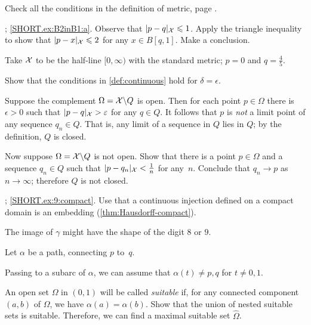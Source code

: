 \setcounter{eqtn}{0}

\begin{multicols}{2}

 Check all the conditions in the definition of metric, page \pageref{page:def:metric}.

\parbf{\ref{ex:B2inB1}}; \ref{SHORT.ex:B2inB1:a}.
Observe that $\dist{p}{q}{\spc{X}}\le 1$. 
Apply the triangle inequality to show that $\dist{p}{x}{\spc{X}}\le 2$ for any $x\in B[q,1]$.
Make a conclusion.

Take $\mathcal{X}$ to be the half-line $[0,\infty)$ with the standard metric; $p=0$ and $q=\tfrac45$.

Show that the conditions in \ref{def:continuous} hold for $\delta=\epsilon$.

Suppose the complement $\Omega=\mathcal{X}\backslash Q$ is open.
Then for each point $p\in \Omega$ there is $\epsilon>0$ such that $\dist{p}{q}{\spc{X}}>\epsilon$ for any $q\in Q$.
It follows that $p$ is \textit{not} a limit point of any sequence $q_n\in Q$.
That is, any limit of a sequence in $Q$ lies in $Q$;
by the definition, $Q$ is closed.

Now suppose $\Omega=\mathcal{X}\backslash Q$ is not open.
Show that there is a point $p\in \Omega$ and a sequence $q_n\in Q$ such that $\dist{p}{q_n}{\spc{X}}\z<\tfrac 1n$ for any~$n$.
Conclude that $q_n\to p$ as $n\to \infty$;
therefore $Q$ is not closed.


\setcounter{eqtn}{0}

\parbf{\ref{ex:9}}; \ref{SHORT.ex:9:compact}. Use that a continuous injection defined on a compact domain is an embedding (\ref{thm:Hausdorff-compact}).

 The image of $\gamma$ might have the shape of the digit $8$ or $9$.

Let $\alpha$ be a path, connecting $p$ to~$q$.

Passing to a subarc of $\alpha$,
we can assume that $\alpha(t)\ne p,q$ for $t\ne0,1$.

An open set $\Omega$ in $(0,1)$ will be called {}\emph{suitable}
if, for any connected component $(a,b)$ of $\Omega$, we have $\alpha(a)=\alpha(b)$.
Show that the union of nested suitable sets is suitable.
Therefore, we can find a maximal suitable set $\hat \Omega$.


\end{multicols}
